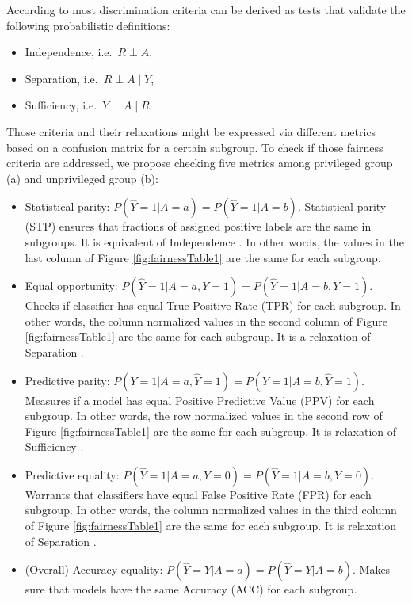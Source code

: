 According to \citet{barocas-hardt-narayanan} most discrimination
criteria can be derived as tests that validate the following
probabilistic definitions:

\begin{itemize}
\tightlist
\item
  Independence, i.e.~\(R \perp A\),
\item
  Separation, i.e.~\(R \perp A \mid Y\),
\item
  Sufficiency, i.e.~\(Y \perp A \mid R\).
\end{itemize}

Those criteria and their relaxations might be expressed via different
metrics based on a confusion matrix for a certain subgroup. To check if
those fairness criteria are addressed, we propose checking five metrics
among privileged group (a) and unprivileged group (b):

\begin{itemize}
\tightlist
\item
  Statistical parity:
  \(P(\hat{Y} = 1 | A = a) = P(\hat{Y} = 1 | A = b)\). Statistical
  parity (STP) ensures that fractions of assigned positive labels are
  the same in subgroups. It is equivalent of Independence
  \citep{statisticalparity}. In other words, the values in the last
  column of Figure \ref{fig:fairnessTable1} are the same for each
  subgroup.
\item
  Equal opportunity:
  \(P(\hat{Y} = 1 | A = a, Y = 1) = P(\hat{Y} = 1 | A = b, Y = 1)\).
  Checks if classifier has equal True Positive Rate (TPR) for each
  subgroup. In other words, the column normalized values in the second
  column of Figure \ref{fig:fairnessTable1} are the same for each
  subgroup. It is a relaxation of Separation \citep{NIPS20166374}.
\item
  Predictive parity:
  \(P(Y = 1 | A = a, \hat{Y} = 1) = P(Y = 1 | A = b, \hat{Y} = 1)\).
  Measures if a model has equal Positive Predictive Value (PPV) for each
  subgroup. In other words, the row normalized values in the second row
  of Figure \ref{fig:fairnessTable1} are the same for each subgroup. It
  is relaxation of Sufficiency \citep{ppv}.
\item
  Predictive equality:
  \(P(\hat{Y} = 1 | A = a, Y = 0) = P(\hat{Y} = 1 | A = b, Y = 0)\).
  Warrants that classifiers have equal False Positive Rate (FPR) for
  each subgroup. In other words, the column normalized values in the
  third column of Figure \ref{fig:fairnessTable1} are the same for each
  subgroup. It is relaxation of Separation \citep{ppe}.
\item
  (Overall) Accuracy equality:
  \(P(\hat{Y} = Y | A = a) = P(\hat{Y} = Y | A = b)\). Makes sure that
  models have the same Accuracy (ACC) for each subgroup.
  \citep{accuracy}
\end{itemize}

